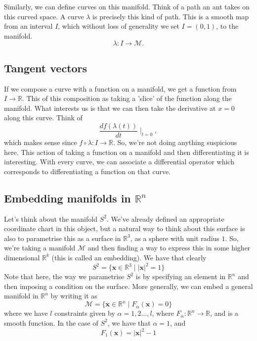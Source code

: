 \documentclass[11pt, oneside]{article}   	%
\theoremstyle{slanted}
\begin{document}
Similarly, we can define curves on this manifold. Think of a path an ant takes on this curved space. A curve $\lambda$ is precisely this kind of path. This is a smooth map from an interval $I$, which without loss of generality we set $I = (0, 1)$, to the manifold. 
\[ 
	\lambda : I \rightarrow \mathcal{M}. 
\]

\subsection{Tangent vectors}
If we compose a curve with a function on a manifold, we get a function from $I \rightarrow \mathbb{R}$. This of this composition as taking a 'slice' of the function along the manifold. What interests us is that we can then take the derivative at $x = 0$ along this curve. 
Think of 
\[
	\frac{d f (\lambda (t))}{dt}\mid_{t = 0}, 
\]
which makes sense since $f \circ \lambda : I \rightarrow \mathbb{R}$. So, we're not doing anything suspicious here. 
This action of taking a function on a manifold and then differentiating it is interesting. With every curve, we can associate a differential operator which corresponds to differentiating a function on that curve. 

\subsection{Embedding manifolds in $\mathbb{R}^n$} 
Let's think about the manifold $S^2$. We've already defined an appropriate coordinate chart in this object, but a natural way to think about this surface is also to parametrise this as a surface in $\mathbb{R}^3 $, as a sphere with unit radius $1$. So, we're taking a manifold $\mathcal{M}$ and then finding a way to express this in some higher dimensional $\mathbb{R}^k$ (this is called an embedding).  We have that clearly
\[ 	
	S^2 = \{ \mathbf{x} \in \mathbb{R}^3 \mid |\mathbf{x}|^2  =1 \} 
\] 
Note that here, the way we parametrise $S^2$ is by specifying an element in $\mathbb{R}^n$ and then imposing a condition on the surface. More generally, we can embed a general manifold in $\mathbb{R}^n$ by writing it as 
\[ 
	\mathcal{M} = \{ \mathbf{x} \in \mathbb{R}^n \mid F_\alpha(\mathbf{x} ) = 0 \}  \]
where we have $l$ constraints given by $\alpha = 1, 2 \dots, l$, where $F_\alpha : \mathbb{ R}^n \rightarrow \mathbb{R}$, and is a smooth function. In the case of $S^2$, we have that $\alpha = 1$, and 
\[ 
	F_1 ( \mathbf{x} ) = |\mathbf{x}|^2 - 1
\]  
\end{document}
